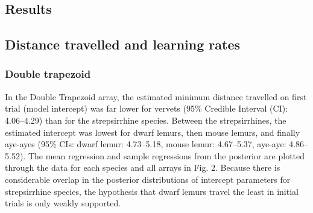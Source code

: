 \documentclass[twoside,12pt,final]{ucthesis-CA2012}
\begin{document}
\begin{ucmainmatter}
\hypertarget{results}{%
\section{Results}\label{results}}

\hypertarget{distance-travelled-and-learning-rates}{%
\subsection{Distance travelled and learning rates}\label{distance-travelled-and-learning-rates}}

\hypertarget{double-trapezoid}{%
\subsubsection{Double trapezoid}\label{double-trapezoid}}

In the Double Trapezoid array, the estimated minimum distance travelled on first trial (model intercept) was far lower for vervets (95\% Credible Interval (CI): 4.06--4.29) than for the strepsirrhine species. Between the strepsirrhines, the estimated intercept was lowest for dwarf lemurs, then mouse lemurs, and finally aye-ayes (95\% CIs: dwarf lemur: 4.73--5.18, mouse lemur: 4.67--5.37, aye-aye: 4.86--5.52). The mean regression and sample regressions from the posterior are plotted through the data for each species and all arrays in Fig. 2. Because there is considerable overlap in the posterior distributions of intercept parameters for strepsirrhine species, the hypothesis that dwarf lemurs travel the least in initial trials is only weakly supported.


\end{ucmainmatter}
\end{document}
